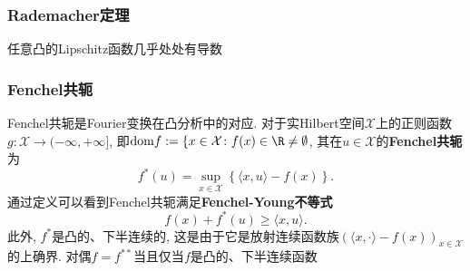 \subsubsection{Rademacher定理}

\begin{theorem}[Rademacher]\label{thm:Rademacher}
	任意凸的Lipschitz函数几乎处处有导数
\end{theorem}


\subsubsection{Fenchel共轭}

Fenchel共轭是Fourier变换在凸分析中的对应. 
对于实Hilbert空间$\mathcal{X}$上的正则函数$g \colon \mathcal{X} \to (-\infty, +\infty]$, 即$\mathrm{dom} f := \{x \in \mathcal{X} \colon f(x) \in \R \neq \emptyset$, 其在$u \in \mathcal{X}$的\textbf{Fenchel共轭}为
\begin{equation}
	f^*(u) = \sup_{x \in \mathcal{X}} \left\{ \langle x, u \rangle - f(x) \right\}. 
\end{equation}
通过定义可以看到Fenchel共轭满足\textbf{Fenchel-Young不等式}
\begin{equation}
	f(x) + f^*(u) \geq \langle x, u \rangle. 
\end{equation}
此外, $f^*$是凸的、下半连续的, 这是由于它是放射连续函数族$(\langle x, \cdot \rangle - f(x))_{x \in \mathcal{X}}$的上确界. 
对偶$f = f^{**}$当且仅当$f$是凸的、下半连续函数













































